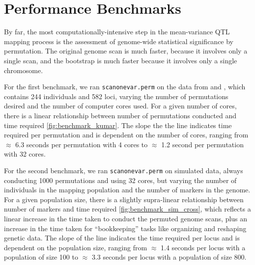 \documentclass[9pt,twocolumn,twoside]{gsag3jnl}
\begin{document}




\section*{Performance Benchmarks}

By far, the most computationally-intensive step in the mean-variance QTL mapping process is the assessment of genome-wide statistical significance by permutation.
The original genome scan is much faster, because it involves only a single scan, and the bootstrap is much faster because it involves only a single chromosome.

For the first benchmark, we ran \texttt{scanonevar.perm} on the data from \citet{Kumar2013} and \CortyReanalysisPaper, which contains 244 individuals and 582 loci, varying the number of permutations desired and the number of computer cores used.
For a given number of cores, there is a linear relationship between number of permutations conducted and time required \autoref{fig:benchmark_kumar}.
The slope the the line indicates time required per permutation and is dependent on the number of cores, ranging from $\approx$ 6.3 seconds per permutation with 4 cores to $\approx$ 1.2 second per permutation with 32 cores.

For the second benchmark, we ran \texttt{scanonevar.perm} on simulated data, always conducting 1000 permutations and using 32 cores, but varying the number of individuals in the mapping population and the number of markers in the genome.
For a given population size, there is a slightly supra-linear relationship between number of markers and time required \autoref{fig:benchmark_sim_cross}, which reflects a linear increase in the time taken to conduct the permuted genome scans, plus an increase in the time taken for ``bookkeeping'' tasks like organizing and reshaping genetic data.
The slope of the line indicates the time required per locus and is dependent on the population size, ranging from $\approx$ 1.4 seconds per locus with a population of size 100 to $\approx$ 3.3 seconds per locus with a population of size 800.
\end{document}

